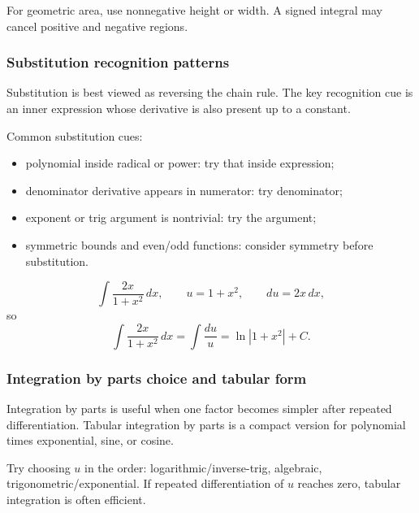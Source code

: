 \begin{commonmistake}
For geometric area, use nonnegative height or width.  A signed integral may
cancel positive and negative regions.
\end{commonmistake}

\newpage
\subsubsection{Substitution recognition patterns}
\begin{extension}
Substitution is best viewed as reversing the chain rule.  The key recognition
cue is an inner expression whose derivative is also present up to a constant.
\end{extension}

\begin{examtip}
Common substitution cues:
\begin{itemize}[leftmargin=*]
\item polynomial inside radical or power: try that inside expression;
\item denominator derivative appears in numerator: try denominator;
\item exponent or trig argument is nontrivial: try the argument;
\item symmetric bounds and even/odd functions: consider symmetry before substitution.
\end{itemize}
\end{examtip}

\begin{examplebox}[title={Inside-Derivative Match}]
\[
\int \frac{2x}{1+x^2}\,dx,
\qquad u=1+x^2,
\qquad du=2x\,dx,
\]
so
\[
\int \frac{2x}{1+x^2}\,dx=\int \frac{du}{u}=\ln|1+x^2|+C.
\]
\end{examplebox}

\newpage
\subsubsection{Integration by parts choice and tabular form}
\begin{extension}
Integration by parts is useful when one factor becomes simpler after repeated
differentiation.  Tabular integration by parts is a compact version for
polynomial times exponential, sine, or cosine.
\end{extension}

\begin{examtip}
Try choosing \(u\) in the order: logarithmic/inverse-trig, algebraic,
trigonometric/exponential.  If repeated differentiation of \(u\) reaches zero,
tabular integration is often efficient.
\end{examtip}

